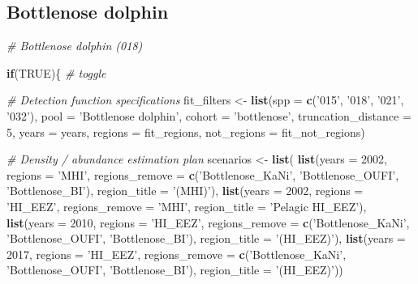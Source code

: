 \documentclass[
]{book}
\newenvironment{Shaded}{\begin{snugshade}}{\end{snugshade}}
\newcommand{\CommentTok}[1]{\textcolor[rgb]{0.56,0.35,0.01}{\textit{#1}}}
\newcommand{\ControlFlowTok}[1]{\textcolor[rgb]{0.13,0.29,0.53}{\textbf{#1}}}
\newcommand{\DataTypeTok}[1]{\textcolor[rgb]{0.13,0.29,0.53}{#1}}
\newcommand{\DecValTok}[1]{\textcolor[rgb]{0.00,0.00,0.81}{#1}}
\newcommand{\KeywordTok}[1]{\textcolor[rgb]{0.13,0.29,0.53}{\textbf{#1}}}
\newcommand{\NormalTok}[1]{#1}
\newcommand{\OtherTok}[1]{\textcolor[rgb]{0.56,0.35,0.01}{#1}}
\newcommand{\StringTok}[1]{\textcolor[rgb]{0.31,0.60,0.02}{#1}}
\begin{document}
\hypertarget{bottlenose-dolphin-1}{%
\subsection*{Bottlenose dolphin}\label{bottlenose-dolphin-1}}

\begin{Shaded}
\begin{Highlighting}[]
\CommentTok{# Bottlenose dolphin (018)}

\ControlFlowTok{if}\NormalTok{(}\OtherTok{TRUE}\NormalTok{)\{ }\CommentTok{# toggle}

  \CommentTok{# Detection function specifications}
\NormalTok{  fit_filters <-}
\StringTok{    }\KeywordTok{list}\NormalTok{(}\DataTypeTok{spp =} \KeywordTok{c}\NormalTok{(}\StringTok{'015'}\NormalTok{, }\StringTok{'018'}\NormalTok{, }\StringTok{'021'}\NormalTok{, }\StringTok{'032'}\NormalTok{),}
         \DataTypeTok{pool =} \StringTok{'Bottlenose dolphin'}\NormalTok{,}
         \DataTypeTok{cohort =} \StringTok{'bottlenose'}\NormalTok{,}
         \DataTypeTok{truncation_distance =} \DecValTok{5}\NormalTok{,}
         \DataTypeTok{years =}\NormalTok{ years,}
         \DataTypeTok{regions =}\NormalTok{ fit_regions,}
         \DataTypeTok{not_regions =}\NormalTok{ fit_not_regions)}

  \CommentTok{# Density / abundance estimation plan}
\NormalTok{  scenarios <-}\StringTok{ }\KeywordTok{list}\NormalTok{(}
    \KeywordTok{list}\NormalTok{(}\DataTypeTok{years =} \DecValTok{2002}\NormalTok{,}
       \DataTypeTok{regions =} \StringTok{'MHI'}\NormalTok{,}
       \DataTypeTok{regions_remove =} \KeywordTok{c}\NormalTok{(}\StringTok{'Bottlenose_KaNi'}\NormalTok{, }\StringTok{'Bottlenose_OUFI'}\NormalTok{, }\StringTok{'Bottlenose_BI'}\NormalTok{),}
       \DataTypeTok{region_title =} \StringTok{'(MHI)'}\NormalTok{),}
    \KeywordTok{list}\NormalTok{(}\DataTypeTok{years =} \DecValTok{2002}\NormalTok{, }
         \DataTypeTok{regions =} \StringTok{'HI_EEZ'}\NormalTok{,}
         \DataTypeTok{regions_remove =} \StringTok{'MHI'}\NormalTok{,}
         \DataTypeTok{region_title =} \StringTok{'Pelagic HI_EEZ'}\NormalTok{),}
    \KeywordTok{list}\NormalTok{(}\DataTypeTok{years =} \DecValTok{2010}\NormalTok{,}
         \DataTypeTok{regions =} \StringTok{'HI_EEZ'}\NormalTok{,}
         \DataTypeTok{regions_remove =} \KeywordTok{c}\NormalTok{(}\StringTok{'Bottlenose_KaNi'}\NormalTok{, }\StringTok{'Bottlenose_OUFI'}\NormalTok{, }\StringTok{'Bottlenose_BI'}\NormalTok{),}
       \DataTypeTok{region_title =} \StringTok{'(HI_EEZ)'}\NormalTok{),}
    \KeywordTok{list}\NormalTok{(}\DataTypeTok{years =} \DecValTok{2017}\NormalTok{,}
         \DataTypeTok{regions =} \StringTok{'HI_EEZ'}\NormalTok{,}
         \DataTypeTok{regions_remove =} \KeywordTok{c}\NormalTok{(}\StringTok{'Bottlenose_KaNi'}\NormalTok{, }\StringTok{'Bottlenose_OUFI'}\NormalTok{, }\StringTok{'Bottlenose_BI'}\NormalTok{),}
       \DataTypeTok{region_title =} \StringTok{'(HI_EEZ)'}\NormalTok{))}
  

\end{Highlighting}
\end{Shaded}
\end{document}
